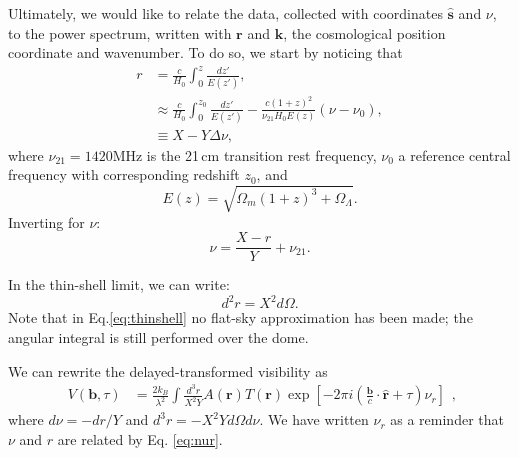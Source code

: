 \documentclass[twocolumn,apj,numberedappendix]{emulateapj}
\renewcommand\[{\begin{equation}}
\renewcommand\]{\end{equation}}
\begin{document}
Ultimately,
we would like to relate the data, collected with coordinates $\hat{\boldsymbol{s}}$
and $\nu$, to the power spectrum, written with 
$\boldsymbol{r}$ and $\boldsymbol{k}$, the cosmological position coordinate and wavenumber. To do so, we start by noticing that
\[
\begin{aligned}r & =\frac{c}{H_{0}}\int_{0}^{z}\frac{dz'}{E(z')},\\
 & \approx\frac{c}{H_{0}}\int_{0}^{z_{0}}\frac{dz'}{E(z')}-\frac{c(1+z)^{2}}{\nu_{21}H_{0}E(z)}\left(\nu-\nu_{0}\right),\\
 & \equiv X-Y\Delta\nu,
\end{aligned} \label{eq:r}
\]
where $\nu_{21}=1420$MHz is the 21\,cm transition rest frequency, $\nu_{0}$
a reference central frequency with corresponding redshift $z_{0}$,
and 
\[
E(z)=\sqrt{\Omega_{m}(1+z)^{3}+\Omega_{\Lambda}}.
\]
Inverting for $\nu$:
\begin{equation}
\nu=\frac{X-r}{Y}+\nu_{21}.\label{eq:nur}
\end{equation}

In the thin-shell limit, we can write:
\begin{equation}
d^2r=X^2d\Omega. 
\label{eq:thinshell}
\end{equation}
Note that in Eq.\ref{eq:thinshell} no flat-sky approximation has been made; the angular integral is still performed over the dome. 

We can rewrite the delayed-transformed visibility as 
\small
\[
\begin{aligned}V(\boldsymbol{b},\tau) & =\frac{2k_{B}}{\lambda^{2}}\int\frac{d^{3}r}{X^{2}Y}A(\boldsymbol{r})T(\boldsymbol{r})\exp\left[-2\pi i\left(\frac{\boldsymbol{b}}{c}\cdot\hat{\boldsymbol{r}}+\tau\right)\nu_{r}\right]\end{aligned},
\]
\normalsize
 where $d\nu=-dr/Y$ and $d^{3}r=-X^{2}Yd\Omega d\nu$. 
We have written $\nu_{r}$ as a reminder that $\nu$ and $r$ are related
by Eq. \eqref{eq:nur}. 
\end{document}
